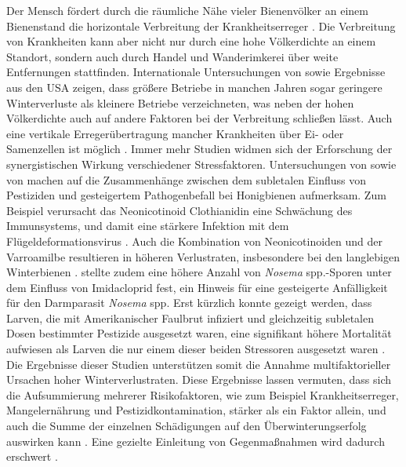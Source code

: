 Der Mensch fördert durch die räumliche Nähe vieler Bienenvölker an einem Bienenstand die horizontale Verbreitung der Krankheitserreger \citep{seeley2015, degrandi-hoffman2015, forfert2016}. Die Verbreitung von Krankheiten kann aber nicht nur durch eine hohe Völkerdichte an einem Standort, sondern auch durch Handel und Wanderimkerei über weite Entfernungen stattfinden. Internationale Untersuchungen von \cite{vanderzee2012, vanderzee2014} sowie Ergebnisse aus den USA \citep{steinhauer2014,lee2015} zeigen, dass größere Betriebe in manchen Jahren sogar geringere Winterverluste als kleinere Betriebe verzeichneten, was neben der hohen Völkerdichte auch auf andere Faktoren bei der Verbreitung schließen lässt. Auch eine vertikale Erregerübertragung mancher Krankheiten über Ei- oder Samenzellen ist möglich \citep{peng2015, yue2007}.
\newline
Immer mehr Studien widmen sich der Erforschung der synergistischen Wirkung verschiedener Stressfaktoren. Untersuchungen von \cite{pettis2012, diprisco2013} sowie von \cite{alburaki2017} machen auf die Zusammenhänge zwischen dem subletalen Einfluss von Pestiziden und gesteigertem Pathogenbefall bei Honigbienen aufmerksam. Zum Beispiel verursacht das Neonicotinoid Clothianidin eine Schwächung des Immunsystems, und damit eine stärkere Infektion mit dem Flügeldeformationsvirus \citep{diprisco2013}. Auch die Kombination von Neonicotinoiden und der Varroamilbe resultieren in höheren Verlustraten, insbesondere bei den langlebigen Winterbienen \citep{straub2019}. \cite{pettis2012} stellte zudem eine höhere Anzahl von \textit{Nosema} spp.-Sporen unter dem Einfluss von Imidacloprid fest, ein Hinweis für eine gesteigerte Anfälligkeit für den Darmparasit \textit{Nosema} spp. Erst kürzlich konnte gezeigt werden, dass Larven, die mit Amerikanischer Faulbrut infiziert und gleichzeitig subletalen Dosen bestimmter Pestizide ausgesetzt waren, eine signifikant höhere Mortalität aufwiesen als Larven die nur einem dieser beiden Stressoren ausgesetzt waren \citep{lopez2017}. Die Ergebnisse dieser Studien unterstützen somit die Annahme multifaktorieller Ursachen hoher Winterverlustraten. Diese Ergebnisse lassen vermuten, dass sich die Aufsummierung mehrerer Risikofaktoren, wie zum Beispiel Krankheitserreger, Mangelernährung und Pestizidkontamination, stärker als ein Faktor allein, und auch die Summe der einzelnen Schädigungen auf den Überwinterungserfolg auswirken kann \citep{goulson2015,barroso-arevalo2019}. Eine gezielte Einleitung von Gegenmaßnahmen wird dadurch erschwert \citep{brodschneider2013}.
\newline
